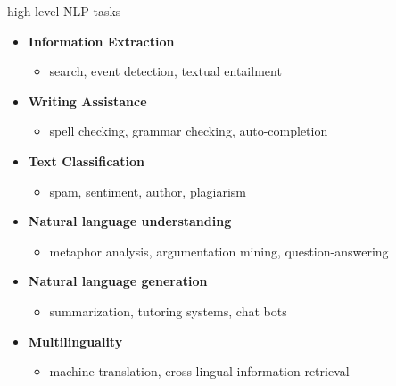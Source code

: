 \documentclass[11pt,compress,t,notes=noshow, xcolor=table]{beamer}
\begin{document}

\begin{frame}{high-level NLP tasks}

\vfill

\begin{itemize}
	\item \textbf{Information Extraction}
	\begin{itemize}
		\item search, event detection, textual entailment
	\end{itemize}
	\item \textbf{Writing Assistance} 
	\begin{itemize}
		\item spell checking, grammar checking, auto-completion
	\end{itemize}
	\item \textbf{Text Classification}
	\begin{itemize}
		\item spam, sentiment, author, plagiarism
	\end{itemize}
	\item \textbf{Natural language understanding} 
	\begin{itemize}
		\item metaphor analysis, argumentation mining, question-answering
	\end{itemize}
	\item \textbf{Natural language generation}
	\begin{itemize}
		\item summarization, tutoring systems, chat bots
	\end{itemize}
	\item \textbf{Multilinguality}
	\begin{itemize}
		\item machine translation, cross-lingual information retrieval
	\end{itemize}
\end{itemize}

\vfill

\end{frame}

\end{document}
